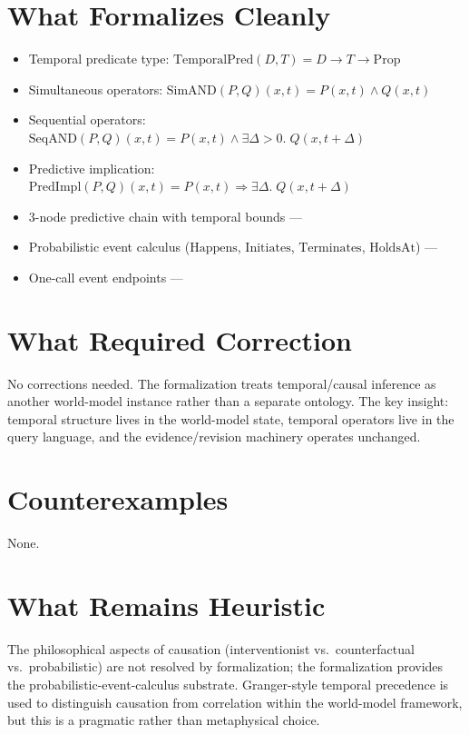 \documentclass[11pt,openany]{report}
\begin{document}
\section{What Formalizes Cleanly}

\begin{itemize}
\item Temporal predicate type: $\mathrm{TemporalPred}(D, T) = D \to T \to \mathrm{Prop}$
\item Simultaneous operators: $\mathrm{SimAND}(P, Q)(x, t) = P(x,t) \wedge Q(x,t)$
\item Sequential operators:
  $\mathrm{SeqAND}(P, Q)(x, t) = P(x, t) \wedge \exists \Delta > 0.\; Q(x, t + \Delta)$
\item Predictive implication:
  $\mathrm{PredImpl}(P, Q)(x, t) = P(x, t) \Rightarrow \exists \Delta.\; Q(x, t + \Delta)$
\item 3-node predictive chain with temporal bounds ---
\item Probabilistic event calculus ($\mathrm{Happens}$, $\mathrm{Initiates}$,
  $\mathrm{Terminates}$, $\mathrm{HoldsAt}$) ---
\item One-call event endpoints ---
\end{itemize}

\section{What Required Correction}

No corrections needed.  The formalization treats temporal/causal
inference as another world-model instance rather than a separate
ontology.  The key insight: temporal structure lives in the
world-model state, temporal operators live in the query language,
and the evidence/revision machinery operates unchanged.

\section{Counterexamples}

None.

\section{What Remains Heuristic}

The philosophical aspects of causation (interventionist vs.\
counterfactual vs.\ probabilistic) are not resolved by formalization;
the formalization provides the probabilistic-event-calculus substrate.
Granger-style temporal precedence is used to distinguish causation from
correlation within the world-model framework, but this is a pragmatic
rather than metaphysical choice.
\end{document}

